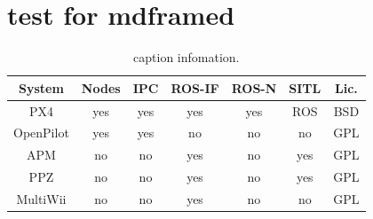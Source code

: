 \section{test for mdframed}
\begin{mdframed}
    \lipsum[1]
\end{mdframed}
%
\begin{table}[]
    \caption[]{caption infomation.}
    \label{table:example}
    \centering
    \begin{mdframed}[userdefinedwidth=0.8\textwidth,align=center]
        \begin{adjustbox}{width=1.0\textwidth}
            \begin{tabular}{@{}ccccccc@{}}
                \toprule
                \textbf{System} & \textbf{Nodes} & \textbf{IPC} & \textbf{ROS-IF} & \textbf{ROS-N} & \textbf{SITL} & \textbf{Lic.} \\ \midrule
                PX4             & yes            & yes          & yes             & yes            & ROS           & BSD           \\
                OpenPilot       & yes            & yes          & no              & no             & no            & GPL           \\
                APM             & no             & no           & yes             & no             & yes           & GPL           \\
                PPZ             & no             & no           & yes             & no             & yes           & GPL           \\
                MultiWii        & no             & no           & yes             & no             & no            & GPL           \\ \bottomrule
            \end{tabular}
        \end{adjustbox}
    \end{mdframed}
\end{table}


